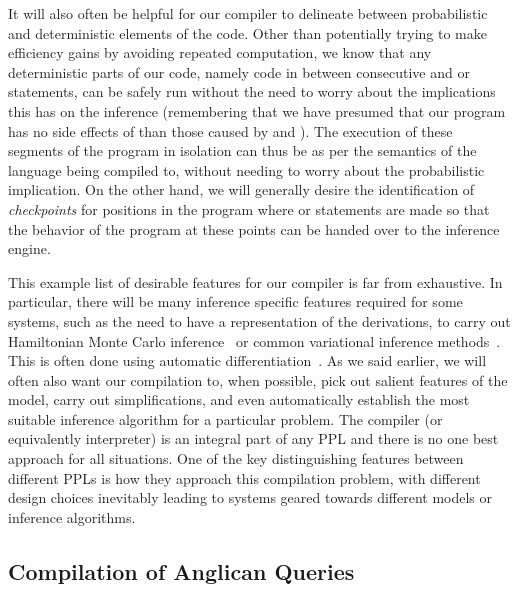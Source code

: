 It will also often be helpful for our compiler to delineate between probabilistic and deterministic
elements of the code.  Other than potentially trying to make efficiency gains by avoiding
repeated computation, we know that any deterministic parts of our code, namely code in between
consecutive \sample and or \observe statements, can be safely run without the need
to worry about the implications this has on the inference (remembering that we have presumed
that our program has no side effects of than those caused by \sample and \observe).  The execution of these segments of
the program in isolation can thus be as per the semantics of the language being compiled to, without needing to
worry about the probabilistic implication.  On the other hand, we will generally desire the identification
of \emph{checkpoints} for positions in the program where \sample or \observe statements are
made so that the behavior of the program at these points can be handed over to the inference
engine.
%

This example list of desirable features for our compiler is far from exhaustive.
In particular, there will be many inference specific features required for some
systems, such as the need to have a representation of the derivations, to carry out 
Hamiltonian Monte Carlo inference~\citep{carpenter2015stan}
or common variational inference methods~\citep{kucukelbir2015automatic}.  
This is often done using automatic differentiation~\citep{baydin2015automatic}.
As we
said earlier, we will often also want our compilation to, when possible,
pick out salient features of the model, carry out simplifications, and even automatically 
establish the most suitable inference algorithm for a particular problem.  The compiler (or equivalently interpreter)
is an integral part of any PPL and there is no one best approach for all situations. 
One of the key distinguishing features between different PPLs is how they approach
this compilation problem, with different design choices inevitably leading to systems
geared towards different models or inference algorithms. 

\subsection{Compilation of Anglican Queries}
\label{sec:proginf:comp:ang}

